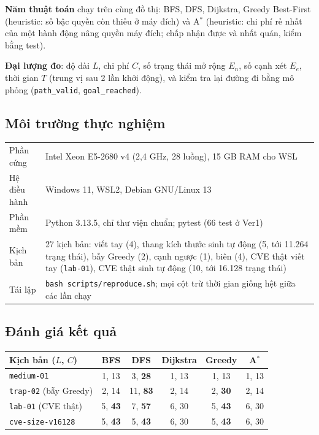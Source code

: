 \documentclass[11pt,a4paper]{article}
\begin{document}
\textbf{Năm thuật toán} chạy trên cùng đồ thị: BFS, DFS, Dijkstra, Greedy Best-First (heuristic: số bậc quyền còn thiếu ở máy đích) và A$^{*}$ (heuristic: chi phí rẻ nhất của một hành động nâng quyền máy đích; chấp nhận được và nhất quán, kiểm bằng test).

\textbf{Đại lượng đo}: độ dài $L$, chi phí $C$, số trạng thái mở rộng $E_n$, số cạnh xét $E_e$, thời gian $T$ (trung vị sau 2 lần khởi động), và kiểm tra lại đường đi bằng mô phỏng (\texttt{path\_valid}, \texttt{goal\_reached}).

\subsection{Môi trường thực nghiệm}

\begin{center}
\small
\begin{tabular}{@{}Y{3.6cm}Y{12.4cm}@{}}
\toprule
Phần cứng & Intel Xeon E5-2680 v4 (2,4 GHz, 28 luồng), 15 GB RAM cho WSL \\
Hệ điều hành & Windows 11, WSL2, Debian GNU/Linux 13 \\
Phần mềm & Python 3.13.5, chỉ thư viện chuẩn; pytest (66 test ở Ver1) \\
Kịch bản & 27 kịch bản: viết tay (4), thang kích thước sinh tự động (5, tới 11.264 trạng thái), bẫy Greedy (2), cạnh ngược (1), biên (4), CVE thật viết tay (\texttt{lab-01}), CVE thật sinh tự động (10, tới 16.128 trạng thái) \\
Tái lập & \texttt{bash scripts/reproduce.sh}; mọi cột trừ thời gian giống hệt giữa các lần chạy \\
\bottomrule
\end{tabular}
\end{center}

\subsection{Đánh giá kết quả}

\begin{center}
\small
\begin{tabular}{@{}lccccc@{}}
\toprule
\textbf{Kịch bản} ($L$, $C$) & \textbf{BFS} & \textbf{DFS} & \textbf{Dijkstra} & \textbf{Greedy} & \textbf{A$^{*}$} \\
\midrule
\texttt{medium-01} & 1, 13 & 3, \textbf{28} & 1, 13 & 1, 13 & 1, 13 \\
\texttt{trap-02} (bẫy Greedy) & 2, 14 & 11, \textbf{83} & 2, 14 & 2, \textbf{30} & 2, 14 \\
\texttt{lab-01} (CVE thật) & 5, \textbf{43} & 7, \textbf{57} & 6, 30 & 5, \textbf{43} & 6, 30 \\
\texttt{cve-size-v16128} & 5, \textbf{43} & 5, \textbf{43} & 6, 30 & 5, \textbf{43} & 6, 30 \\
\bottomrule
\end{tabular}
\end{center}
\end{document}
